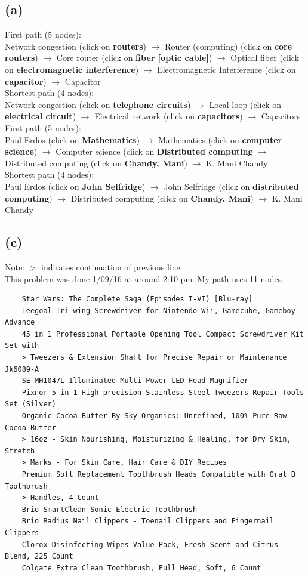 \documentclass{article}
\begin{document}
\subsection*{(a)}
First path (5 nodes): \\
Network congestion (click on \textbf{routers}) $\rightarrow$ Router (computing) 
(click on \textbf{core routers}) $\rightarrow$ Core router 
(click on \textbf{fiber [optic cable]}) $\rightarrow$ Optical fiber (click on
\textbf{electromagnetic interference}) $\rightarrow$ Electromagnetic Interference 
(click on \textbf{capacitor}) $\rightarrow$ Capacitor \\

\noindent Shortest path (4 nodes): \\
Network congestion (click on \textbf{telephone circuits}) $\rightarrow$ Local
loop (click on \textbf{electrical circuit}) $\rightarrow$ Electrical network (click
on \textbf{capacitors}) $\rightarrow$ Capacitors \\

\noindent First path (5 nodes): \\
Paul Erdos (click on \textbf{Mathematics}) $\rightarrow$ Mathematics (click on
\textbf{computer science}) $\rightarrow$ Computer science (click on \textbf{
Distributed computing} $\rightarrow$ Distributed computing (click on 
\textbf{Chandy, Mani}) $\rightarrow$ K. Mani Chandy  \\

\noindent Shortest path (4 nodes): \\
Paul Erdos (click on \textbf{John Selfridge}) $\rightarrow$ 
John Selfridge (click on \textbf{distributed computing}) $\rightarrow$
Distributed computing (click on \textbf{Chandy, Mani}) $\rightarrow$ K. Mani Chandy

\subsection*{(c)}
Note: $>$ indicates continuation of previous line. \\
This problem was done 1/09/16 at around 2:10 pm. My path uses 11 nodes.
\begin{verbatim}
    Star Wars: The Complete Saga (Episodes I-VI) [Blu-ray]
    Leegoal Tri-wing Screwdriver for Nintendo Wii, Gamecube, Gameboy Advance
    45 in 1 Professional Portable Opening Tool Compact Screwdriver Kit Set with 
    > Tweezers & Extension Shaft for Precise Repair or Maintenance Jk6089-A
    SE MH1047L Illuminated Multi-Power LED Head Magnifier
    Pixnor 5-in-1 High-precision Stainless Steel Tweezers Repair Tools Set (Silver)
    Organic Cocoa Butter By Sky Organics: Unrefined, 100% Pure Raw Cocoa Butter 
    > 16oz - Skin Nourishing, Moisturizing & Healing, for Dry Skin, Stretch 
    > Marks - For Skin Care, Hair Care & DIY Recipes 
    Premium Soft Replacement Toothbrush Heads Compatible with Oral B Toothbrush 
    > Handles, 4 Count
    Brio SmartClean Sonic Electric Toothbrush
    Brio Radius Nail Clippers - Toenail Clippers and Fingernail Clippers
    Clorox Disinfecting Wipes Value Pack, Fresh Scent and Citrus Blend, 225 Count
    Colgate Extra Clean Toothbrush, Full Head, Soft, 6 Count
\end{verbatim}
\end{document}

